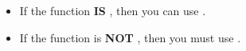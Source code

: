 \begin{itemize}[noitemsep]
\item If the function \textbf{IS} , then you can use .
\item If the function is \textbf{NOT} , then you must use .
\end{itemize}

